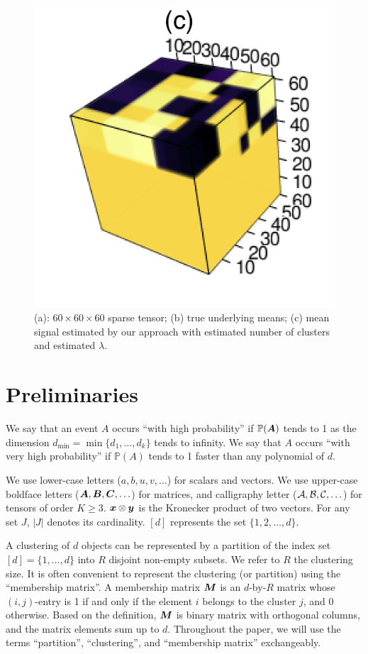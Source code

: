 \documentclass{article}
\begin{document}
\begin{figure}
	\includegraphics[scale=0.5]{figures/figure2/output.png}
	\caption{(a): $60\times 60\times 60$ sparse tensor; (b) true underlying means; (c) mean signal estimated by our approach with estimated number of clusters and estimated $\lambda$.}
	\label{fig2}
\end{figure}


\section{Preliminaries}

We say that an event $A$ occurs ``with high probability'' if $\mathbb{P}(\bm A)$ tends to 1 as the dimension $d_{\min}=\min\{d_1,\ldots,d_k\}$ tends to infinity. We say that $A$ occurs ``with very high probability'' if $\mathbb{P}(A)$ tends to 1 faster than any polynomial of $d$. 


We use lower-case letters ($a,b,u,v,\ldots$) for scalars and vectors. We use upper-case boldface letters ($\bm A,\bm B,\bm C,\ldots$) for matrices, and calligraphy letter ($\mathcal{A}, \mathcal{B}, \mathcal{C},\ldots$) for tensors of order $K\geq 3$. $\bm x\otimes \bm{y}$ is the Kronecker product of two vectors. For any set $J$, $|J|$ denotes its cardinality. $[d]$ represents the set $\{1,2,\ldots,d\}$. 

A clustering of $d$ objects can be represented by a partition of the index set $[d]=\{1,\ldots,d\}$ into $R$ disjoint non-empty subsets. We refer to $R$ the clustering size. It is often convenient to represent the clustering (or partition) using the ``membership matrix''. A membership matrix $\bm M$ is an $d$-by-$R$ matrix whose $(i,j)$-entry is 1 if and only if the element $i$ belongs to the cluster $j$, and 0 otherwise. Based on the definition, $\bm M$ is binary matrix with orthogonal columns, and the matrix elements sum up to $d$. Throughout the paper, we will use the terms ``partition'', ``clustering'', and ``membership matrix'' exchangeably. 
\end{document}
